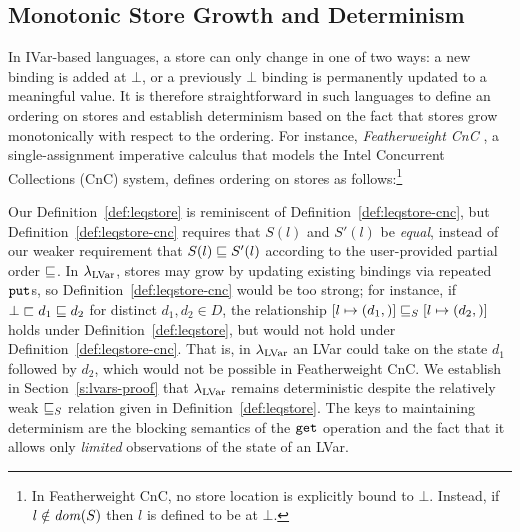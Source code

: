 \subsection{Monotonic Store Growth and Determinism}\label{subsection:monotonicity}

In IVar-based languages, a store can only change in one of two ways: a
new binding is added at $\bot$, or a previously $\bot$ binding is
permanently updated to a meaningful value.  It is therefore
straightforward in such languages to define an ordering on stores and
establish determinism based on the fact that stores grow monotonically
with respect to the ordering. For instance, \emph{Featherweight
CnC} \cite{CnC}, a single-assignment imperative calculus that models
the Intel Concurrent Collections (CnC) system, defines ordering on
stores as follows:\footnote{In Featherweight CnC, no store location is
explicitly bound to $\bot$.  Instead, if $l \notin \mathit{dom}(S)$ then $l$
is defined to be at $\bot$.}

\DefLeqStoreCnC

Our Definition~\ref{def:leqstore} is reminiscent of
Definition~\ref{def:leqstore-cnc}, but
Definition~\ref{def:leqstore-cnc} requires that $S(l)$ and $S'(l)$ be
\emph{equal}, instead of our weaker requirement that $S(l) \sqsubseteq
S'(l)$ according to the user-provided partial order $\sqsubseteq$.  In
$\lambda_{\textrm{LVar}}$, stores may grow by updating existing bindings via
repeated $\mbox{\texttt{put}}$s, so Definition~\ref{def:leqstore-cnc} would be too
strong; for instance, if $\bot \sqsubset d_1 \sqsubseteq d_2$ for distinct
$d_1, d_2 \in D$, the relationship
$\left[ l \mapsto (d_1, \right)] \sqsubseteq_S \left[ l \mapsto (d_2, \right)]$
holds under Definition~\ref{def:leqstore}, but would not hold under
Definition~\ref{def:leqstore-cnc}.  That is, in $\lambda_{\textrm{LVar}}$ an LVar
could take on the state $d_1$ followed by $d_2$, which would not be
possible in Featherweight CnC.  We establish in
Section~\ref{s:lvars-proof} that $\lambda_{\textrm{LVar}}$ remains deterministic
despite the relatively weak $ \sqsubseteq_S $ relation given in
Definition~\ref{def:leqstore}.  The keys to maintaining determinism
are the blocking semantics of the $\mbox{\texttt{get}}$ operation and the fact that
it allows only \emph{limited} observations of the state of an LVar.
